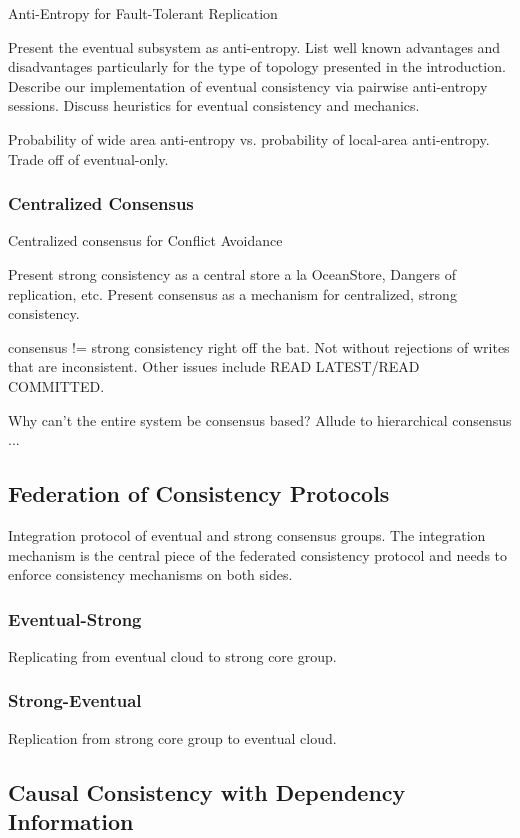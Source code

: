 \documentclass[letterpaper,twocolumn,10pt]{article}
\begin{document}
Anti-Entropy for Fault-Tolerant Replication

Present the eventual subsystem as anti-entropy. List well known advantages and disadvantages particularly for the type of topology presented in the introduction. Describe our implementation of eventual consistency via pairwise anti-entropy sessions. Discuss heuristics for eventual consistency and mechanics.

Probability of wide area anti-entropy vs. probability of local-area anti-entropy. Trade off of eventual-only.

\subsubsection{Centralized Consensus}

Centralized consensus for Conflict Avoidance

Present strong consistency as a central store a la OceanStore, Dangers of replication, etc. Present consensus as a mechanism for centralized, strong consistency.

consensus != strong consistency right off the bat. Not without rejections of writes that are inconsistent. Other issues include READ LATEST/READ COMMITTED.

Why can't the entire system be consensus based? Allude to hierarchical consensus ...

\subsection{Federation of Consistency Protocols}

Integration protocol of eventual and strong consensus groups. The integration mechanism is the central piece of the federated consistency protocol and needs to enforce consistency mechanisms on both sides.

\subsubsection{Eventual-Strong}

Replicating from eventual cloud to strong core group.

\subsubsection{Strong-Eventual}

Replication from strong core group to eventual cloud.

\subsection{Causal Consistency with Dependency Information}
\end{document}
